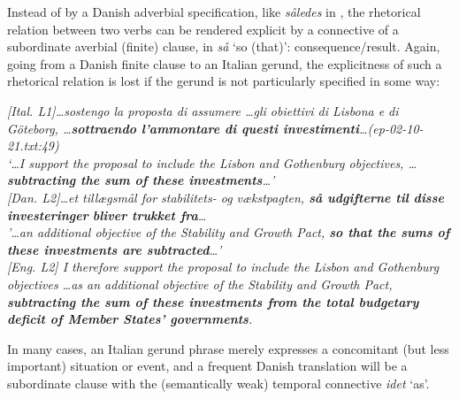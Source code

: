 \documentclass[output=paper]{LSP/langsci}
\begin{document}
Instead of by a Danish adverbial specification, like \textit{således} in , the rhetorical relation between two verbs can be rendered explicit by a connective of a subordinate averbial (finite) clause, in  \textit{så} `so (that)': consequence/result. Again, going from a Danish finite clause to an Italian gerund, the explicitness of such a rhetorical relation is lost if the gerund is not particularly specified in some way:

\ea\label{ex:korzen:20}
\textit{\textup{[Ital. L1]}\ldots sostengo la proposta di assumere \ldots  gli obiettivi di Lisbona e di Göteborg, \ldots  \textbf{sottraendo l'ammontare di questi investimenti}\ldots  \textup{(ep-02-10-21.txt:49)}\\
`\ldots I support the proposal to include the Lisbon and Gothenburg objectives, \ldots \textbf{subtracting the sum of these investments}\ldots '\\
  \textup{[Dan. L2]}\ldots et tillægsmål for stabilitets- og vækstpagten, \textbf{så udgifterne til disse investeringer} \textbf{bliver trukket fra}\ldots \\
  '\ldots an additional objective of the Stability and Growth Pact, \textbf{so that the sums of these investments are subtracted}\ldots '\\
  \textup{[Eng. L2]} I therefore support the proposal to include the Lisbon and Gothenburg objectives \ldots  as an additional objective of the Stability and Growth Pact, \textbf{subtracting the sum of these investments from the total budgetary deficit of Member States' governments}.}
\z

In many cases, an Italian gerund phrase merely expresses a concomitant (but less important) situation or event, and a frequent Danish translation will be a subordinate clause with the (semantically weak) temporal connective \textit{idet} `as'. 
\end{document}
